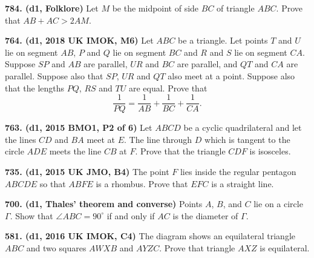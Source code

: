 \documentclass{article}
\begin{document}
\textbf{784. (\color{red}d1\color{black}, Folklore)} Let $M$ be the midpoint of side $BC$ of triangle $ABC.$ Prove that $AB + AC > 2AM.$

\textbf{764. (\color{red}d1\color{black}, 2018 UK IMOK, M6)} Let $ABC$ be a triangle. Let points $T$ and $U$ lie on segment $AB$, $P$ and $Q$ lie on segment $BC$ and $R$ and $S$ lie on segment $CA$. Suppose $SP$ and $AB$ are parallel, $UR$ and $BC$ are parallel, and $QT$ and $CA$ are parallel. Suppose also that $SP$, $UR$ and $QT$ also meet at a point. Suppose also that the lengths $PQ$, $RS$ and $TU$ are equal. Prove that $$\frac{1}{PQ} = \frac{1}{AB} + \frac{1}{BC} + \frac{1}{CA}.$$

\textbf{763. (\color{red}d1\color{black}, 2015 BMO1, P2 of 6)} Let $ABCD$ be a cyclic quadrilateral and let the lines $CD$ and $BA$ meet at $E$. The line through $D$ which is tangent to the circle $ADE$ meets the line $CB$ at $F$. Prove that the triangle $CDF$ is isosceles.

\textbf{735. (\color{red}d1\color{black}, 2015 UK JMO, B4)} The point $F$ lies inside the regular pentagon $ABCDE$ so that $ABFE$ is a rhombus. Prove that $EFC$ is a straight line.

\textbf{700. (\color{red}d1\color{black}, Thales' theorem and converse)} Points \(A\), \(B\), and \(C\) lie on a circle \(\Gamma\). Show that \(\angle ABC = 90^\circ\) if and only if \(AC\) is the diameter of \(\Gamma\).

\textbf{581. (\color{red}d1\color{black}, 2016 UK IMOK, C4)} The diagram shows an equilateral triangle $A B C$ and two squares $A W X B$ and $A Y Z C$.
Prove that triangle $A X Z$ is equilateral.
\end{document}
